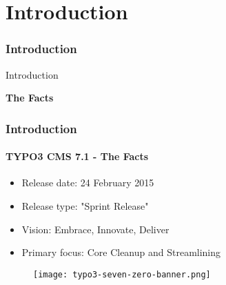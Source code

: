 %

\section{Introduction}
\begin{frame}[fragile]
	\frametitle{Introduction}

	\begin{center}\huge{Introduction}\end{center}
	\begin{center}\huge{\color{typo3darkgrey}\textbf{The Facts}}\end{center}

\end{frame}


\begin{frame}[fragile]
	\frametitle{Introduction}
	\framesubtitle{TYPO3 CMS 7.1 - The Facts}

	\begin{itemize}
		\item Release date: 24 February 2015
		\item Release type: "Sprint Release"
		\item Vision: Embrace, Innovate, Deliver
		\item Primary focus: Core Cleanup and Streamlining
	\end{itemize}

	\begin{figure}
		\texttt{[image: typo3-seven-zero-banner.png]}
	\end{figure}

\end{frame}

